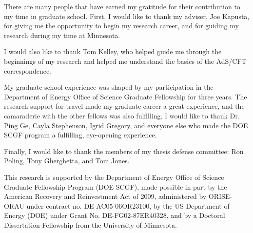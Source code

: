 
There are many people that have earned my gratitude for their contribution to my
time in graduate school. 
First, I would like to thank my adviser, Joe Kapusta, for giving me the opportunity to begin my research career, and for guiding my research during my time at Minnesota.

I would also like to thank Tom Kelley, who helped guide me through the beginnings of my research and helped me understand the basics of the AdS/CFT correspondence.

My graduate school experience was shaped by my participation in the Department of Energy Office of Science Graduate Fellowship for three years. 
The research support for travel made my graduate career a great experience, and the camaraderie with the other fellows was also fulfilling.
I would like to thank Dr. Ping Ge, Cayla Stephenson, Igrid Gregory, and everyone else who made the DOE SCGF program a fulfilling, eye-opening experience.

Finally, I would like to thank the members of my thesis defense committee: Ron Poling, Tony Gherghetta, and Tom Jones.

This research is supported by the Department of Energy Office of Science Graduate Fellowship Program (DOE SCGF), made possible in part by the American Recovery and Reinvestment Act of 2009, administered by ORISE-ORAU under contract no. DE-AC05-06OR23100, by the US Department of Energy (DOE) under Grant No. DE-FG02-87ER40328, and by a Doctoral Dissertation Fellowship from the University of Minnesota.

